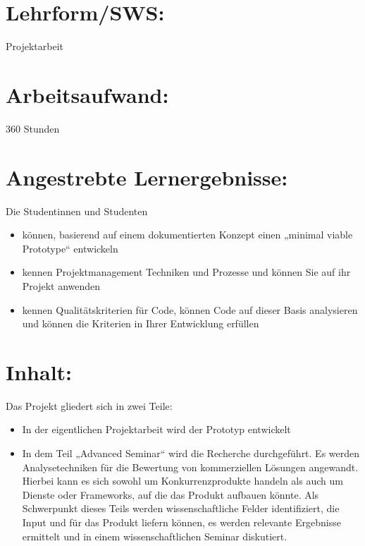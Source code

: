 \section*{Lehrform/SWS:}\label{lehrformsws-8}

Projektarbeit

\section*{Arbeitsaufwand:}\label{arbeitsaufwand-14}

360 Stunden

\section*{Angestrebte
Lernergebnisse:}\label{angestrebte-lernergebnisse-8}

Die Studentinnen und Studenten

\begin{itemize}
\item
  können, basierend auf einem dokumentierten Konzept einen „minimal
  viable Prototype`` entwickeln
\item
  kennen Projektmanagement Techniken und Prozesse und können Sie auf ihr
  Projekt anwenden
\item
  kennen Qualitätskriterien für Code, können Code auf dieser Basis
  analysieren und können die Kriterien in Ihrer Entwicklung erfüllen
\end{itemize}

\section*{Inhalt:}\label{inhalt-8}

Das Projekt gliedert sich in zwei Teile:

\begin{itemize}
\item
  In der eigentlichen Projektarbeit wird der Prototyp entwickelt
\item
  In dem Teil „Advanced Seminar`` wird die Recherche durchgeführt. Es
  werden Analysetechniken für die Bewertung von kommerziellen Lösungen
  angewandt. Hierbei kann es sich sowohl um Konkurrenzprodukte handeln
  als auch um Dienste oder Frameworks, auf die das Produkt aufbauen
  könnte. Als Schwerpunkt dieses Teils werden wissenschaftliche Felder
  identifiziert, die Input und für das Produkt liefern können, es werden
  relevante Ergebnisse ermittelt und in einem wissenschaftlichen Seminar
  diskutiert.
\end{itemize}

